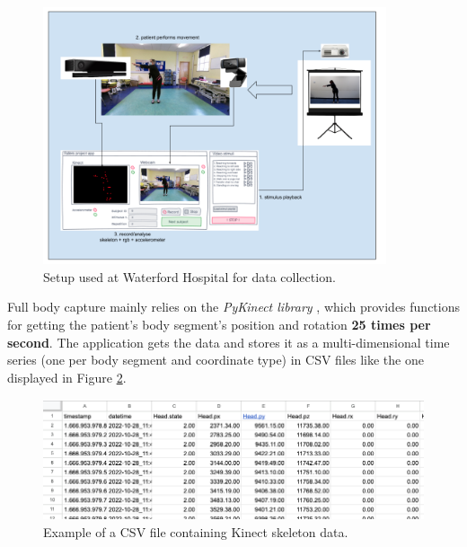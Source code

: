                     \begin{figure}[H]
                        \centering
                        \includegraphics[width=0.9\textwidth]{./resources/images/kinect/setup.png}
                        \caption{Setup used at Waterford Hospital for data collection.}
                        \label{fig:kinect_setup}
                    \end{figure}

                    Full body capture mainly relies on the \textit{PyKinect library} \cite{GitHubKinectPyKinect2}, which provides functions for getting the patient's body segment's position and rotation \textbf{25 times per second}. The application gets the data and stores it as a multi-dimensional time series (one per body segment and coordinate type) in CSV files like the one displayed in Figure \ref{fig:csv_structure}.
                    \newpage
                    \begin{figure}[H]
                        \centering
                        \includegraphics[width=1.0\textwidth]{./resources/images/other/data.png}
                        \caption{Example of a CSV file containing Kinect skeleton data.}
                        \label{fig:csv_structure}
                    \end{figure}

